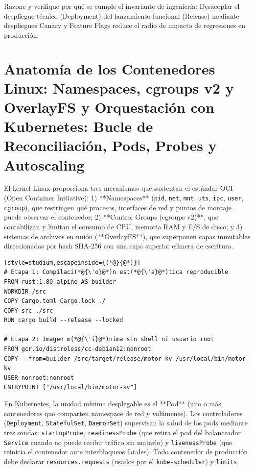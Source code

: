\documentclass{book}
\begin{document}
\begin{tcolorbox}[title={Autoficha}, studiumcheck, breakable]

Razone y verifique por qué se cumple el invariante de ingeniería: Desacoplar el despliegue técnico (Deployment) del lanzamiento funcional (Release) mediante despliegues Canary y Feature Flags reduce el radio de impacto de regresiones en producción.
\end{tcolorbox}

\section{Anatomía de los Contenedores Linux: Namespaces, cgroups v2 y OverlayFS y Orquestación con Kubernetes: Bucle de Reconciliación, Pods, Probes y Autoscaling}

El kernel Linux proporciona tres mecanismos que sustentan el estándar OCI (Open Container Initiative): 1) **Namespaces** (\texttt{pid}, \texttt{net}, \texttt{mnt}, \texttt{uts}, \texttt{ipc}, \texttt{user}, \texttt{cgroup}), que restringen qué procesos, interfaces de red y puntos de montaje puede observar el contenedor; 2) **Control Groups (cgroups v2)**, que contabilizan y limitan el consumo de CPU, memoria RAM y E/S de disco; y 3) sistemas de archivos en unión (**OverlayFS**), que superponen capas inmutables direccionadas por hash SHA-256 con una capa superior efímera de escritura.
\begin{lstlisting}[style=studium,escapeinside={(*@}{@*)}]
# Etapa 1: Compilaci(*@{\'o}@*)n est(*@{\'a}@*)tica reproducible
FROM rust:1.80-alpine AS builder
WORKDIR /src
COPY Cargo.toml Cargo.lock ./
COPY src ./src
RUN cargo build --release --locked

# Etapa 2: Imagen m(*@{\'i}@*)nima sin shell ni usuario root
FROM gcr.io/distroless/cc-debian12:nonroot
COPY --from=builder /src/target/release/motor-kv /usr/local/bin/motor-kv
USER nonroot:nonroot
ENTRYPOINT ["/usr/local/bin/motor-kv"]
\end{lstlisting}
En Kubernetes, la unidad mínima desplegable es el **Pod** (uno o más contenedores que comparten namespace de red y volúmenes). Los controladores (\texttt{Deployment}, \texttt{StatefulSet}, \texttt{DaemonSet}) supervisan la salud de los pods mediante tres sondas: \texttt{startupProbe}, \texttt{readinessProbe} (que retira el pod del balanceador \texttt{Service} cuando no puede recibir tráfico sin matarlo) y \texttt{livenessProbe} (que reinicia el contenedor ante interbloqueos fatales). Todo contenedor de producción debe declarar \texttt{resources.requests} (usados por el \texttt{kube-scheduler}) y \texttt{limits}.
\end{document}
